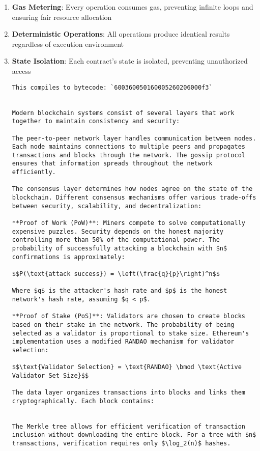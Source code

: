 \documentclass[12pt]{article}
\begin{document}
{{{\begin{itemize}
\end{itemize}
\begin{enumerate}
	\item \textbf{Gas Metering}: Every operation consumes gas, preventing infinite loops and ensuring fair resource allocation
	\item \textbf{Deterministic Operations}: All operations produce identical results regardless of execution environment
	\item \textbf{State Isolation}: Each contract's state is isolated, preventing unauthorized access

\begin{lstlisting}
This compiles to bytecode: `600360050160005260206000f3`


Modern blockchain systems consist of several layers that work together to maintain consistency and security:

The peer-to-peer network layer handles communication between nodes. Each node maintains connections to multiple peers and propagates transactions and blocks through the network. The gossip protocol ensures that information spreads throughout the network efficiently.

The consensus layer determines how nodes agree on the state of the blockchain. Different consensus mechanisms offer various trade-offs between security, scalability, and decentralization:

**Proof of Work (PoW)**: Miners compete to solve computationally expensive puzzles. Security depends on the honest majority controlling more than 50% of the computational power. The probability of successfully attacking a blockchain with $n$ confirmations is approximately:

$$P(\text{attack success}) = \left(\frac{q}{p}\right)^n$$

Where $q$ is the attacker's hash rate and $p$ is the honest network's hash rate, assuming $q < p$.

**Proof of Stake (PoS)**: Validators are chosen to create blocks based on their stake in the network. The probability of being selected as a validator is proportional to stake size. Ethereum's implementation uses a modified RANDAO mechanism for validator selection:

$$\text{Validator Selection} = \text{RANDAO} \bmod \text{Active Validator Set Size}$$

The data layer organizes transactions into blocks and links them cryptographically. Each block contains:


The Merkle tree allows for efficient verification of transaction inclusion without downloading the entire block. For a tree with $n$ transactions, verification requires only $\log_2(n)$ hashes.


\end{lstlisting}
\end{enumerate}}}}
\end{document}
